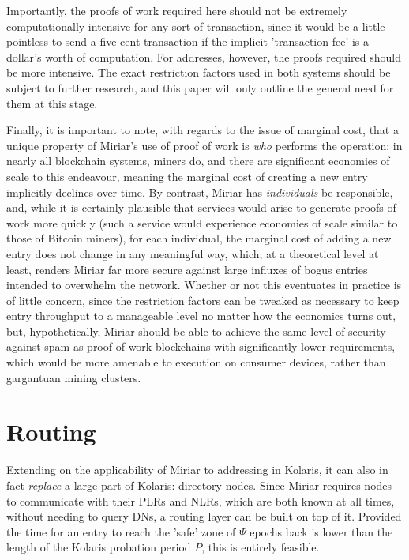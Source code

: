 \documentclass{extreport}
\begin{document}
Importantly, the proofs of work required here should not be extremely computationally intensive for any sort of transaction, since it would be a little pointless to send a five cent transaction if the implicit 'transaction fee' is a dollar's worth of computation. For addresses, however, the proofs required should be more intensive. The exact restriction factors used in both systems should be subject to further research, and this paper will only outline the general need for them at this stage.

Finally, it is important to note, with regards to the issue of marginal cost, that a unique property of Miriar's use of proof of work is \emph{who} performs the operation: in nearly all blockchain systems, miners do, and there are significant economies of scale to this endeavour, meaning the marginal cost of creating a new entry implicitly declines over time. By contrast, Miriar has \emph{individuals} be responsible, and, while it is certainly plausible that services would arise to generate proofs of work more quickly (such a service would experience economies of scale similar to those of Bitcoin miners), for each individual, the marginal cost of adding a new entry does not change in any meaningful way, which, at a theoretical level at least, renders Miriar far more secure against large influxes of bogus entries intended to overwhelm the network. Whether or not this eventuates in practice is of little concern, since the restriction factors can be tweaked as necessary to keep entry throughput to a manageable level no matter how the economics turns out, but, hypothetically, Miriar should be able to achieve the same level of security against spam as proof of work blockchains with significantly lower requirements, which would be more amenable to execution on consumer devices, rather than gargantuan mining clusters.

\chapter{Routing}
\label{sec:org28e611f}

Extending on the applicability of Miriar to addressing in Kolaris, it can also in fact \emph{replace} a large part of Kolaris: directory nodes. Since Miriar requires nodes to communicate with their PLRs and NLRs, which are both known at all times, without needing to query DNs, a routing layer can be built on top of it. Provided the time for an entry to reach the 'safe' zone of \(\Psi\) epochs back is lower than the length of the Kolaris probation period \(P\), this is entirely feasible.
\end{document}
